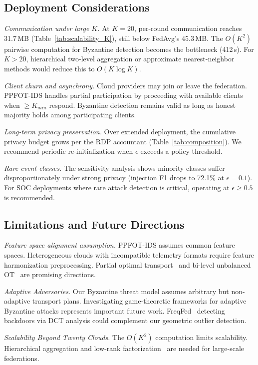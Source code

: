 \documentclass{ieeeaccess}
\theoremstyle{plain}
\theoremstyle{definition}
\theoremstyle{remark}
\begin{document}
\subsection{Deployment Considerations}

\textit{Communication under large $K$.} At $K = 20$, per-round communication reaches 31.7\,MB (Table~\ref{tab:scalability_K}), still below FedAvg's 45.3\,MB. The $O(K^2)$ pairwise computation for Byzantine detection becomes the bottleneck (412\,s). For $K > 20$, hierarchical two-level aggregation or approximate nearest-neighbor methods would reduce this to $O(K\log K)$.

\textit{Client churn and asynchrony.} Cloud providers may join or leave the federation. PPFOT-IDS handles partial participation by proceeding with available clients when $\geq K_{min}$ respond. Byzantine detection remains valid as long as honest majority holds among participating clients.

\textit{Long-term privacy preservation.} Over extended deployment, the cumulative privacy budget grows per the RDP accountant (Table~\ref{tab:composition}). We recommend periodic re-initialization when $\epsilon$ exceeds a policy threshold.

\textit{Rare event classes.} The sensitivity analysis shows minority classes suffer disproportionately under strong privacy (injection F1 drops to 72.1\% at $\epsilon = 0.1$). For SOC deployments where rare attack detection is critical, operating at $\epsilon \geq 0.5$ is recommended.

\subsection{Limitations and Future Directions}

\textit{Feature space alignment assumption.} PPFOT-IDS assumes common feature spaces. Heterogeneous clouds with incompatible telemetry formats require feature harmonization preprocessing. Partial optimal transport~\cite{nguyen2024} and bi-level unbalanced OT~\cite{chen2025} are promising directions.

\textit{Adaptive Adversaries.} Our Byzantine threat model assumes arbitrary but non-adaptive transport plans. Investigating game-theoretic frameworks for adaptive Byzantine attacks represents important future work. FreqFed~\cite{fereidooni2024} detecting backdoors via DCT analysis could complement our geometric outlier detection.

\textit{Scalability Beyond Twenty Clouds.} The $O(K^2)$ computation limits scalability. Hierarchical aggregation and low-rank factorization~\cite{scetbon2024} are needed for large-scale federations.
\end{document}
